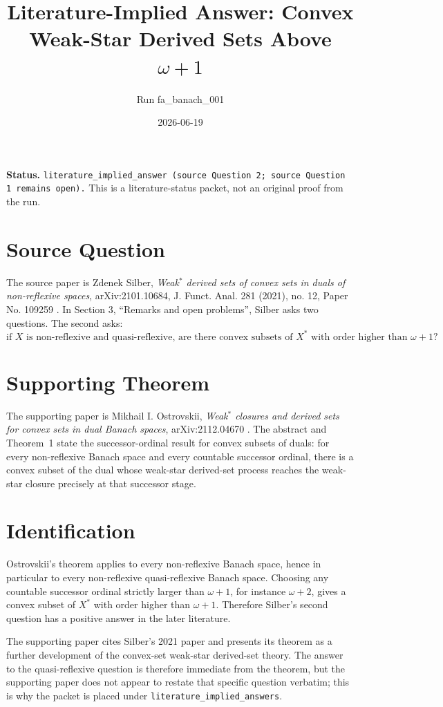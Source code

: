 \documentclass[11pt]{article}
\title{Literature-Implied Answer: Convex Weak-Star Derived Sets Above \texorpdfstring{$\omega+1$}{omega+1}}
\author{Run fa\_banach\_001}
\date{2026-06-19}
\begin{document}
\maketitle

\noindent\textbf{Status.}
\texttt{literature\_implied\_answer (source Question 2; source Question 1 remains open).}
This is a literature-status packet, not an original proof from the run.

\section*{Source Question}

The source paper is Zdenek Silber, \emph{Weak$^*$ derived sets of convex sets in duals of non-reflexive spaces}, arXiv:2101.10684, J. Funct. Anal. 281 (2021), no. 12, Paper No. 109259 \cite{Sil21}.  In Section 3, ``Remarks and open problems'', Silber asks two questions.  The second asks:
\[
\text{if } X \text{ is non-reflexive and quasi-reflexive, are there convex subsets of } X^*
\text{ with order higher than } \omega+1?
\]

\section*{Supporting Theorem}

The supporting paper is Mikhail I. Ostrovskii, \emph{Weak$^*$ closures and derived sets for convex sets in dual Banach spaces}, arXiv:2112.04670 \cite{Ost21}.  The abstract and Theorem~1 state the successor-ordinal result for convex subsets of duals: for every non-reflexive Banach space and every countable successor ordinal, there is a convex subset of the dual whose weak-star derived-set process reaches the weak-star closure precisely at that successor stage.

\section*{Identification}

Ostrovskii's theorem applies to every non-reflexive Banach space, hence in particular to every non-reflexive quasi-reflexive Banach space.  Choosing any countable successor ordinal strictly larger than $\omega+1$, for instance $\omega+2$, gives a convex subset of $X^*$ with order higher than $\omega+1$.  Therefore Silber's second question has a positive answer in the later literature.

The supporting paper cites Silber's 2021 paper and presents its theorem as a further development of the convex-set weak-star derived-set theory.  The answer to the quasi-reflexive question is therefore immediate from the theorem, but the supporting paper does not appear to restate that specific question verbatim; this is why the packet is placed under \texttt{literature\_implied\_answers}.
\end{document}
